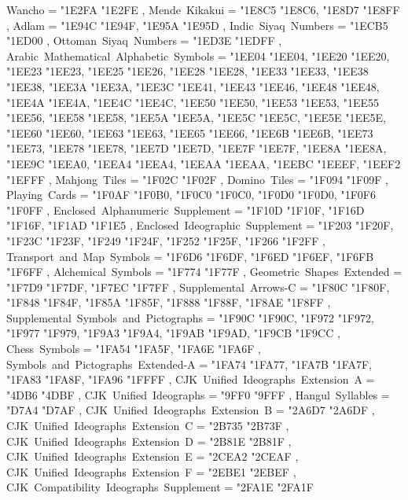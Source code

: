 {    Wancho                                         = { {"1E2FA} {"1E2FE} },
    Mende~Kikakui                                  = { {"1E8C5} {"1E8C6}, {"1E8D7} {"1E8FF} },
    Adlam                                          = { {"1E94C} {"1E94F}, {"1E95A} {"1E95D} },
    Indic~Siyaq~Numbers                            = { {"1ECB5} {"1ED00} },
    Ottoman~Siyaq~Numbers                          = { {"1ED3E} {"1EDFF} },
    Arabic~Mathematical~Alphabetic~Symbols         = { {"1EE04} {"1EE04}, {"1EE20} {"1EE20}, {"1EE23} {"1EE23}, {"1EE25} {"1EE26}, {"1EE28} {"1EE28}, {"1EE33} {"1EE33}, {"1EE38} {"1EE38}, {"1EE3A} {"1EE3A}, {"1EE3C} {"1EE41}, {"1EE43} {"1EE46}, {"1EE48} {"1EE48}, {"1EE4A} {"1EE4A}, {"1EE4C} {"1EE4C}, {"1EE50} {"1EE50}, {"1EE53} {"1EE53}, {"1EE55} {"1EE56}, {"1EE58} {"1EE58}, {"1EE5A} {"1EE5A}, {"1EE5C} {"1EE5C}, {"1EE5E} {"1EE5E}, {"1EE60} {"1EE60}, {"1EE63} {"1EE63}, {"1EE65} {"1EE66}, {"1EE6B} {"1EE6B}, {"1EE73} {"1EE73}, {"1EE78} {"1EE78}, {"1EE7D} {"1EE7D}, {"1EE7F} {"1EE7F}, {"1EE8A} {"1EE8A}, {"1EE9C} {"1EEA0}, {"1EEA4} {"1EEA4}, {"1EEAA} {"1EEAA}, {"1EEBC} {"1EEEF}, {"1EEF2} {"1EFFF} },
    Mahjong~Tiles                                  = { {"1F02C} {"1F02F} },
    Domino~Tiles                                   = { {"1F094} {"1F09F} },
    Playing~Cards                                  = { {"1F0AF} {"1F0B0}, {"1F0C0} {"1F0C0}, {"1F0D0} {"1F0D0}, {"1F0F6} {"1F0FF} },
    Enclosed~Alphanumeric~Supplement               = { {"1F10D} {"1F10F}, {"1F16D} {"1F16F}, {"1F1AD} {"1F1E5} },
    Enclosed~Ideographic~Supplement                = { {"1F203} {"1F20F}, {"1F23C} {"1F23F}, {"1F249} {"1F24F}, {"1F252} {"1F25F}, {"1F266} {"1F2FF} },
    Transport~and~Map~Symbols                      = { {"1F6D6} {"1F6DF}, {"1F6ED} {"1F6EF}, {"1F6FB} {"1F6FF} },
    Alchemical~Symbols                             = { {"1F774} {"1F77F} },
    Geometric~Shapes~Extended                      = { {"1F7D9} {"1F7DF}, {"1F7EC} {"1F7FF} },
    Supplemental~Arrows-C                          = { {"1F80C} {"1F80F}, {"1F848} {"1F84F}, {"1F85A} {"1F85F}, {"1F888} {"1F88F}, {"1F8AE} {"1F8FF} },
    Supplemental~Symbols~and~Pictographs           = { {"1F90C} {"1F90C}, {"1F972} {"1F972}, {"1F977} {"1F979}, {"1F9A3} {"1F9A4}, {"1F9AB} {"1F9AD}, {"1F9CB} {"1F9CC} },
    Chess~Symbols                                  = { {"1FA54} {"1FA5F}, {"1FA6E} {"1FA6F} },
    Symbols~and~Pictographs~Extended-A             = { {"1FA74} {"1FA77}, {"1FA7B} {"1FA7F}, {"1FA83} {"1FA8F}, {"1FA96} {"1FFFF} },
    CJK~Unified~Ideographs~Extension~A             = { {"4DB6} {"4DBF} },
    CJK~Unified~Ideographs                         = { {"9FF0} {"9FFF} },
    Hangul~Syllables                               = { {"D7A4} {"D7AF} },
    CJK~Unified~Ideographs~Extension~B             = { {"2A6D7} {"2A6DF} },
    CJK~Unified~Ideographs~Extension~C             = { {"2B735} {"2B73F} },
    CJK~Unified~Ideographs~Extension~D             = { {"2B81E} {"2B81F} },
    CJK~Unified~Ideographs~Extension~E             = { {"2CEA2} {"2CEAF} },
    CJK~Unified~Ideographs~Extension~F             = { {"2EBE1} {"2EBEF} },
    CJK~Compatibility~Ideographs~Supplement        = { {"2FA1E} {"2FA1F} }
  }

